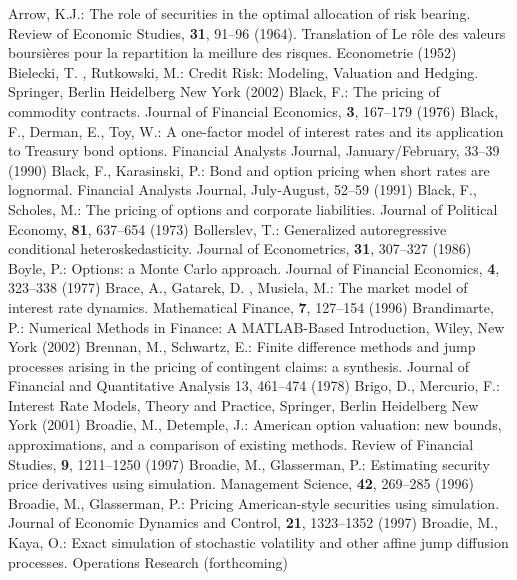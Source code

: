 \begin{thebibliography}{[KLR73]}
 Arrow, K.J.: The role of securities in the optimal allocation of risk bearing.  Review of Economic Studies, \textbf{31}, 91--96 (1964).  Translation of Le r\^ole des valeurs boursi\`eres pour la repartition la meillure des risques.  Econometrie (1952)
Bielecki, T. , Rutkowski, M.: Credit Risk: Modeling, Valuation and Hedging. Springer, Berlin Heidelberg New York (2002)
 Black, F.: The pricing of commodity contracts.  Journal of Financial Economics, \textbf{3}, 167--179 (1976)
 Black, F., Derman, E., Toy, W.: A one-factor model of interest rates and its application to Treasury bond options. Financial Analysts Journal, January/February,  33--39 (1990)
 Black, F., Karasinski, P.: Bond and option pricing when short rates are lognormal. Financial Analysts Journal, July-August,  52--59 (1991)
 Black, F., Scholes, M.: The pricing of options and corporate liabilities. Journal of Political Economy, \textbf{81},  637--654 (1973)
 Bollerslev, T.: Generalized autoregressive conditional heteroskedasticity. Journal of Econometrics, \textbf{31},  307--327 (1986)
 Boyle, P.: Options: a Monte Carlo approach.  Journal of Financial Economics, \textbf{4}, 323--338 (1977)
 Brace, A., Gatarek, D. , Musiela, M.: The market model of interest rate dynamics. Mathematical Finance, \textbf{7},  127--154 (1996)
Brandimarte, P.: Numerical Methods in Finance:  A MATLAB-Based Introduction, Wiley, New York (2002)
 Brennan, M., Schwartz, E.: Finite difference methods and jump processes arising in the pricing of contingent claims:  a synthesis. Journal of Financial and Quantitative Analysis 13,  461--474 (1978)
Brigo, D., Mercurio, F.: Interest Rate Models,  Theory and Practice, Springer, Berlin Heidelberg New York (2001)
 Broadie, M., Detemple, J.: American option valuation:  new bounds, approximations, and a comparison of existing methods. Review of Financial Studies, \textbf{9},  1211--1250 (1997)
 Broadie, M., Glasserman, P.: Estimating security price derivatives using simulation.  Management Science, \textbf{42}, 269--285 (1996)
 Broadie, M., Glasserman, P.: Pricing American-style securities using simulation. Journal of Economic Dynamics and Control, \textbf{21},  1323--1352 (1997)
 Broadie, M., Kaya, O.: Exact simulation of stochastic volatility and other affine jump diffusion processes.  Operations Research (forthcoming)

\end{thebibliography}
